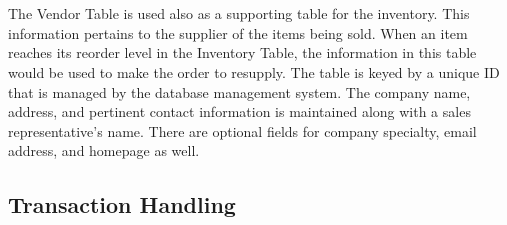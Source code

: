 \documentclass{report}
\begin{document}
\begin{itemize}
        \\
        \\
        The Vendor Table is used also as a supporting table for the inventory. This information
        pertains to the supplier of the items being sold. When an item reaches its reorder level
        in the Inventory Table, the information in this table would be used to make the order to
        resupply. The table is keyed by a unique ID that is managed by the database management
        system. The company name, address, and pertinent contact information is maintained along
        with a sales representative's name. There are optional fields for company specialty, email
        address, and homepage as well.

        \subsection{Transaction Handling}


\end{itemize}
\end{document}
